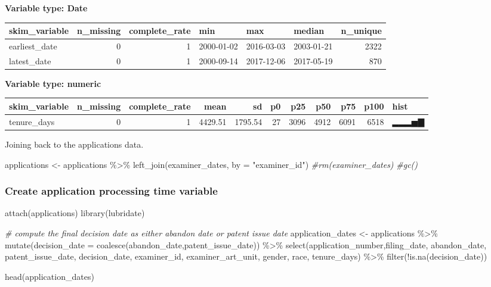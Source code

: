 \documentclass[
]{article}
\newenvironment{Shaded}{\begin{snugshade}}{\end{snugshade}}
\newcommand{\AttributeTok}[1]{\textcolor[rgb]{0.77,0.63,0.00}{#1}}
\newcommand{\CommentTok}[1]{\textcolor[rgb]{0.56,0.35,0.01}{\textit{#1}}}
\newcommand{\FunctionTok}[1]{\textcolor[rgb]{0.00,0.00,0.00}{#1}}
\newcommand{\NormalTok}[1]{#1}
\newcommand{\OtherTok}[1]{\textcolor[rgb]{0.56,0.35,0.01}{#1}}
\newcommand{\SpecialCharTok}[1]{\textcolor[rgb]{0.00,0.00,0.00}{#1}}
\newcommand{\StringTok}[1]{\textcolor[rgb]{0.31,0.60,0.02}{#1}}
\begin{document}
\textbf{Variable type: Date}

\begin{longtable}[]{@{}lrrlllr@{}}
\toprule
skim\_variable & n\_missing & complete\_rate & min & max & median &
n\_unique \\
\midrule
\endhead
earliest\_date & 0 & 1 & 2000-01-02 & 2016-03-03 & 2003-01-21 & 2322 \\
latest\_date & 0 & 1 & 2000-09-14 & 2017-12-06 & 2017-05-19 & 870 \\
\bottomrule
\end{longtable}

\textbf{Variable type: numeric}

\begin{longtable}[]{@{}lrrrrrrrrrl@{}}
\toprule
skim\_variable & n\_missing & complete\_rate & mean & sd & p0 & p25 &
p50 & p75 & p100 & hist \\
\midrule
\endhead
tenure\_days & 0 & 1 & 4429.51 & 1795.54 & 27 & 3096 & 4912 & 6091 &
6518 & ▂▂▂▅▇ \\
\bottomrule
\end{longtable}

Joining back to the applications data.

\begin{Shaded}
\begin{Highlighting}[]
\NormalTok{applications }\OtherTok{\textless{}{-}}\NormalTok{ applications }\SpecialCharTok{\%\textgreater{}\%} 
  \FunctionTok{left\_join}\NormalTok{(examiner\_dates, }\AttributeTok{by =} \StringTok{"examiner\_id"}\NormalTok{)}
\CommentTok{\#rm(examiner\_dates)}
\CommentTok{\#gc()}
\end{Highlighting}
\end{Shaded}

\hypertarget{create-application-processing-time-variable}{%
\subsubsection{Create application processing time
variable}\label{create-application-processing-time-variable}}

\begin{Shaded}
\begin{Highlighting}[]
\FunctionTok{attach}\NormalTok{(applications)}
\FunctionTok{library}\NormalTok{(lubridate)}

\CommentTok{\# compute the final decision date as either abandon date or patent issue date}
\NormalTok{application\_dates }\OtherTok{\textless{}{-}}\NormalTok{ applications }\SpecialCharTok{\%\textgreater{}\%} 
    \FunctionTok{mutate}\NormalTok{(}\AttributeTok{decision\_date =} \FunctionTok{coalesce}\NormalTok{(abandon\_date,patent\_issue\_date)) }\SpecialCharTok{\%\textgreater{}\%}
    \FunctionTok{select}\NormalTok{(application\_number,filing\_date, abandon\_date, patent\_issue\_date, decision\_date, examiner\_id, examiner\_art\_unit, gender, race, tenure\_days) }\SpecialCharTok{\%\textgreater{}\%}
    \FunctionTok{filter}\NormalTok{(}\SpecialCharTok{!}\FunctionTok{is.na}\NormalTok{(decision\_date))}

\FunctionTok{head}\NormalTok{(application\_dates)}
\end{Highlighting}
\end{Shaded}
\end{document}
